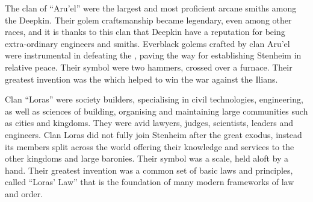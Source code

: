 \label{sec:Aru'el}
The clan of ``Aru'el'' were the largest and most proficient arcane smiths among
the Deepkin. Their golem craftsmanship became legendary, even among other
races, and it is thanks to this clan that Deepkin have a reputation for being
extra-ordinary engineers and smiths. Everblack golems crafted by clan Aru'el
were instrumental in defeating the , paving the way for
establishing Stenheim in relative peace. Their symbol were two hammers,
crossed over a furnace. Their greatest invention was the
 which helped to win the war against the Ilians.

\label{sec:Loras}
Clan ``Loras'' were society builders, specialising in civil technologies,
engineering, as well as sciences of building, organising and maintaining large
communities such as cities and kingdoms. They were avid lawyers, judges,
scientists, leaders and engineers. Clan Loras did not fully join Stenheim
after the great exodus, instead its members split across the world offering
their knowledge and services to the other kingdoms and large baronies. Their
symbol was a scale, held aloft by a hand. Their greatest invention was a
common set of basic laws and principles, called ``Loras' Law'' that is the
foundation of many modern frameworks of law and order.

